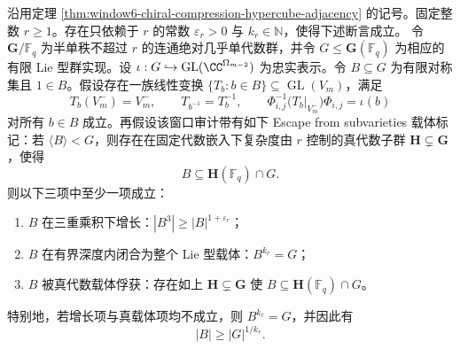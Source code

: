 \begin{theorem}\label{distill:breuillard_green_tao_approximate_groups_and_helfgott_growth-product_growth_dichotomy-chiral_compressed_lie_type_audit}
沿用定理 \ref{thm:window6-chiral-compression-hypercube-adjacency} 的记号。固定整数 \(r\ge 1\)。存在只依赖于 \(r\) 的常数
\(\varepsilon_r>0\) 与 \(k_r\in\mathbb N\)，使得下述断言成立。
令 \(\mathbf G/\mathbb F_q\) 为半单秩不超过 \(r\) 的连通绝对几乎单代数群，并令 \(G\le \mathbf G(\mathbb F_q)\) 为相应的有限 Lie 型群实现。设
\(\iota:G\hookrightarrow \operatorname{GL}(\CC^{\Omega_{m-2}})\) 为忠实表示。令 \(B\subseteq G\) 为有限对称集且 \(1\in B\)。假设存在一族线性变换
\(\{T_b:b\in B\}\subseteq \operatorname{GL}(V_m)\)，满足
\[
T_b(V_m^-)=V_m^-,\qquad T_{b^{-1}}=T_b^{-1},\qquad
\Phi_{i,j}^{-1}\bigl(T_b|_{V_m^-}\bigr)\Phi_{i,j}=\iota(b)
\]
对所有 \(b\in B\) 成立。再假设该窗口审计带有如下 Escape from subvarieties 载体标记：若 \(\langle B\rangle<G\)，则存在在固定代数嵌入下复杂度由 \(r\) 控制的真代数子群 \(\mathbf H\subsetneq \mathbf G\)，使得
\[
B\subseteq \mathbf H(\mathbb F_q)\cap G.
\]
则以下三项中至少一项成立：
\begin{enumerate}
  \item \(B\) 在三重乘积下增长：\(|B^3|\ge |B|^{1+\varepsilon_r}\)；
  \item \(B\) 在有界深度内闭合为整个 Lie 型载体：\(B^{k_r}=G\)；
  \item \(B\) 被真代数载体俘获：存在如上 \(\mathbf H\subsetneq\mathbf G\) 使 \(B\subseteq \mathbf H(\mathbb F_q)\cap G\)。
\end{enumerate}
特别地，若增长项与真载体项均不成立，则 \(B^{k_r}=G\)，并因此有
\[
|B|\ge |G|^{1/k_r}.
\]
\end{theorem}
